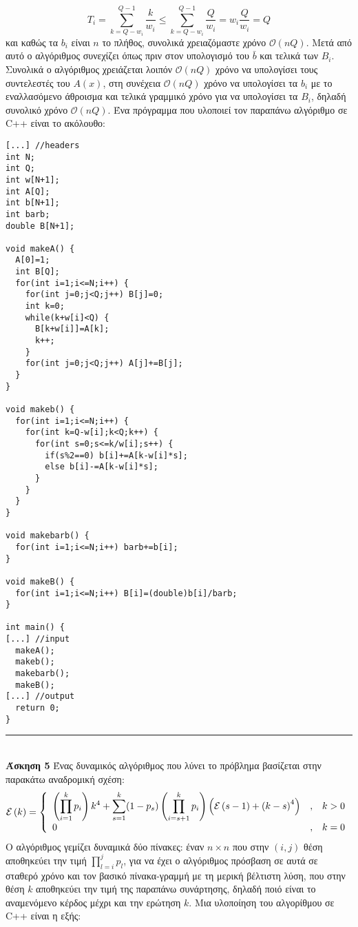 \documentclass[12pt]{article}
\newcommand\en[1]{\latintext #1\greektext}
\newcommand\bigOh{\mathcal{O}}
\newcommand{\HRule}{\rule{\linewidth}{0.1mm}}
\begin{document}
$$T_i=\sum_{k=Q-w_i}^{Q-1}\frac{k}{w_i}\leq\sum_{k=Q-w_i}^{Q-1}\frac{Q}{w_i}=w_i\frac{Q}{w_i}=Q$$
και καθώς τα $b_i$ είναι $n$ το πλήθος, συνολικά χρειαζόμαστε χρόνο $\bigOh\left(nQ\right)$. Μετά από αυτό ο αλγόριθμος συνεχίζει όπως πριν στον υπολογισμό του $\bar{b}$ και τελικά των $B_i$. Συνολικά ο αλγόριθμος χρειάζεται λοιπόν $\bigOh\left(nQ\right)$ χρόνο να υπολογίσει τους συντελεστές του $A\left(x\right)$, στη συνέχεια $\bigOh\left(nQ\right)$ χρόνο να υπολογίσει τα $b_i$ με το εναλλασόμενο άθροισμα και τελικά γραμμικό χρόνο για να υπολογίσει τα $B_i$, δηλαδή συνολικό χρόνο $\bigOh\left(nQ\right)$. Ένα πρόγραμμα που υλοποιεί τον παραπάνω αλγόριθμο σε \en{C++} είναι το ακόλουθο:
\latintext\begin{lstlisting}
[...] //headers
int N;
int Q;
int w[N+1];
int A[Q];
int b[N+1];
int barb;
double B[N+1];

void makeA() {
  A[0]=1;
  int B[Q];
  for(int i=1;i<=N;i++) {
    for(int j=0;j<Q;j++) B[j]=0;
    int k=0;
    while(k+w[i]<Q) {
      B[k+w[i]]=A[k];
      k++;
    }
    for(int j=0;j<Q;j++) A[j]+=B[j];
  }
}

void makeb() {
  for(int i=1;i<=N;i++) {
    for(int k=Q-w[i];k<Q;k++) {
      for(int s=0;s<=k/w[i];s++) {
        if(s%2==0) b[i]+=A[k-w[i]*s];
        else b[i]-=A[k-w[i]*s];
      }
    }
  }
}

void makebarb() {
  for(int i=1;i<=N;i++) barb+=b[i];
}

void makeB() {
  for(int i=1;i<=N;i++) B[i]=(double)b[i]/barb;
}

int main() {
[...] //input
  makeA();
  makeb();
  makebarb();
  makeB();
[...] //output
  return 0;
}
\end{lstlisting}\greektext
\HRule\\
{\bf Άσκηση 5} Ένας δυναμικός αλγόριθμος που λύνει το πρόβλημα βασίζεται στην παρακάτω αναδρομική σχέση:
$$\mathcal{E}\left(k\right)=\left\{\begin{array}{>{\displaystyle}lc>{\displaystyle}l}
\left(\prod_{i=1}^kp_i\right)k^4+\sum_{s=1}^k(1-p_s)\left(\prod_{i=s+1}^kp_i\right)\left(\mathcal{E}\left(s-1\right)+\left(k-s\right)^4\right)&,&k>0\\
0&,&k=0\\
\end{array}\right.$$
Ο αλγόριθμος γεμίζει δυναμικά δύο πίνακες: έναν $n\times n$ που στην $(i,j)$ θέση αποθηκεύει την τιμή $\prod_{l=i}^jp_l$, για να έχει ο αλγόριθμος πρόσβαση σε αυτά σε σταθερό χρόνο και τον βασικό πίνακα-γραμμή με τη μερική βέλτιστη λύση, που στην θέση $k$ αποθηκεύει την τιμή της παραπάνω συνάρτησης, δηλαδή ποιό είναι το αναμενόμενο κέρδος μέχρι και την ερώτηση $k$. Μια υλοποίηση του αλγορίθμου σε \en{C++} είναι η εξής:
\end{document}
